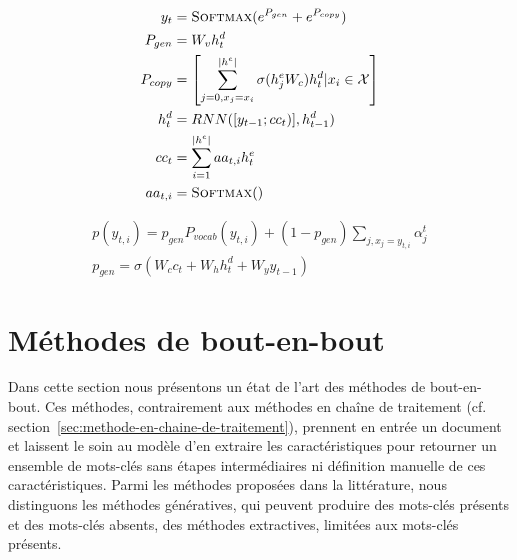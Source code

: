     
    \begin{align}
        y_t & = \textsc{Softmax}(e^{P_{gen}} +e^{P_{copy}}) \\
        P_{gen} & = W_v h^d_t \\
        P_{copy} & = \left[ \sum^{|h^e|}_{j=0, x_j=x_i} \sigma(h^e_j W_c) h^d_t | x_i \in \mathcal{X} \right] \\
        h^d_t & = RNN([y_{t-1};cc_t)],h^d_{t-1}) \\
        cc_t & = \sum^{|h^e|}_{i=1} aa_{t,i} h^e_t \\
        aa_{t,i} & = \textsc{Softmax}()
    \end{align}
    
    
    \begin{align}
        p(y_{t,i}) = p_{gen} P_{vocab}(y_{t,i}) + (1 - p_{gen}) \sum_{j,x_j=y_{t,i}} \alpha^t_j \\
        p_{gen} = \sigma(W_c c_t + W_h h^d_t + W_y y_{t-1})
    \end{align}
\fi



\section{Méthodes de bout-en-bout}
\label{methodes-de-bout-en-bout}


Dans cette section nous présentons un état de l'art des méthodes de bout-en-bout.
Ces méthodes, contrairement aux méthodes en chaîne de traitement (cf. section~\ref{sec:methode-en-chaine-de-traitement}), prennent en entrée un document et laissent le soin au modèle d'en extraire les caractéristiques pour retourner un ensemble de mots-clés sans étapes intermédiaires ni définition manuelle de ces caractéristiques.
Parmi les méthodes proposées dans la littérature, nous distinguons les méthodes génératives, qui peuvent produire des mots-clés présents et des mots-clés absents, des méthodes extractives, limitées aux mots-clés présents.

